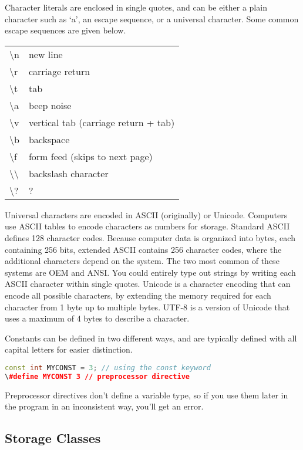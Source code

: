 \documentclass[10pt]{article}
\begin{document}
Character literals are enclosed in single quotes, and can be either a plain character such as `a', an escape sequence, or a universal character. Some common escape sequences are given below.

\begin{center}
\begin{tabular}{l l}
\textbackslash n & new line\\
\textbackslash r & carriage return\\
\textbackslash t & tab\\
\textbackslash a & beep noise\\
\textbackslash v & vertical tab (carriage return + tab)\\
\textbackslash b & backspace\\
\textbackslash f & form feed (skips to next page)\\
\textbackslash\textbackslash & backslash character\\
\textbackslash? & ?\\
\end{tabular}
\end{center}

Universal characters are encoded in ASCII (originally) or Unicode. Computers use ASCII tables to encode characters as numbers for storage. Standard ASCII defines 128 character codes. Because computer data is organized into bytes, each containing 256 bits, extended ASCII contains 256 character codes, where the additional characters depend on the system. The two most common of these systems are OEM and ANSI. You could entirely type out strings by writing each ASCII character within single quotes. Unicode is a character encoding that can encode all possible characters, by extending the memory required for each character from 1 byte up to multiple bytes. UTF-8 is a version of Unicode that uses a maximum of 4 bytes to describe a character. 

Constants can be defined in two different ways, and are typically defined with all capital letters for easier distinction.

\begin{lstlisting}[language=C++]
const int MYCONST = 3; // using the const keyword
\#define MYCONST 3 // preprocessor directive
\end{lstlisting}

Preprocessor directives don't define a variable type, so if you use them later in the program in an inconsistent way, you'll get an error. 

\subsection{Storage Classes}
\end{document}
